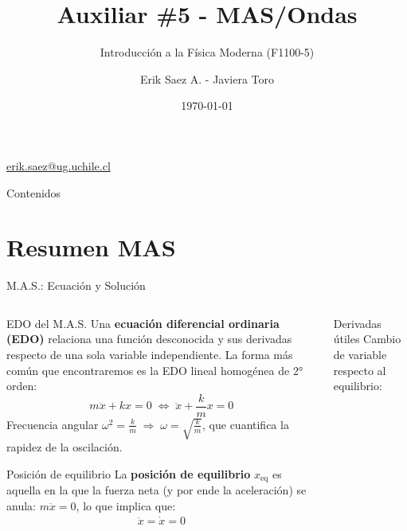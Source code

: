 \documentclass[
    10pt,
    aspectratio=169,
    xcolor={dvipsnames},
    spanish,
    ]{beamer}
\title[Auxiliar \#5 - MAS/Ondas]{\bfseries Auxiliar \#5 - MAS/Ondas}
\subtitle{Introducción a la Física Moderna (F1100-5)}
\author[Erik Saez A.]{Erik Saez A. - Javiera Toro}
\institute[UChile]{Departamento de Ingeniería Eléctrica \\ Universidad de Chile}
\date{\today}
\begin{document}
\begin{frame}
  \titlepage
  \centering
   \href{mailto:erik.saez@ug.uchile.cl}{erik.saez@ug.uchile.cl} \hspace{.2cm}
\end{frame}

\begin{frame}{Contenidos}
  \tableofcontents
\end{frame}

\section{Resumen MAS}

\begin{frame}{M.A.S.: Ecuación y Solución}
  \footnotesize
  \begin{columns}[T]
    \begin{column}{0.58\textwidth}
      \begin{block}{EDO del M.A.S.}
        Una \textbf{ecuación diferencial ordinaria (EDO)} relaciona una función   desconocida y sus derivadas respecto de una sola variable independiente. La forma más común que encontraremos es la EDO lineal homogénea de 2° orden:
        \begin{equation*}
          m\ddot x + kx = 0 \;\Longleftrightarrow\; \ddot x + \frac{k}{m}x = 0
        \end{equation*}
        \noindent Frecuencia angular $\omega^2=\tfrac{k}{m} \;\Rightarrow\; \omega=\sqrt{\tfrac{k}{m}}$, que cuantifica la rapidez de la oscilación.\vspace{-2pt}
      \end{block}
      \begin{block}{Posición de equilibrio}
        La \textbf{posición de equilibrio} $x_{\text{eq}}$ es aquella en la que la fuerza neta (y por ende la aceleración) se anula: $m\ddot x=0$, lo que implica que:\begin{align}
          \ddot{x}= \dot{x} = 0
        \end{align}
      \end{block}
    \end{column}
    \begin{column}{0.45\textwidth}
      \begin{block}{Derivadas útiles}
        Cambio de variable respecto al equilibrio:\\[-2pt]
        \[
          \begin{aligned}

\end{aligned}\]
\end{block}
\end{column}
\end{columns}
\end{frame}
\end{document}
